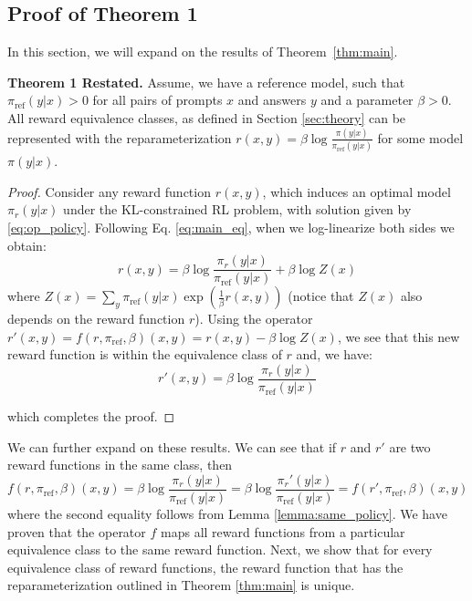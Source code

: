 \documentclass{article}
\newcommand{\piref}{\pi_\text{ref}}
\begin{document}
\subsection{Proof of Theorem 1}
\label{app:thm1}

In this section, we will expand on the results of Theorem~\ref{thm:main}. 

\begin{em}
{\bf Theorem 1 Restated.}
    Assume, we have a reference model, such that $\piref(y|x)>0$ for all pairs of prompts $x$ and answers $y$ and a parameter $\beta>0$. All reward equivalence classes, as defined in Section \ref{sec:theory} can be represented with the reparameterization $r(x, y) = \beta \log \frac{\pi(y|x)}{\piref(y|x)}$ for some model $\pi(y|x)$.
\end{em}
\begin{proof}
Consider any reward function $r(x,y)$, which induces an optimal model $\pi_r(y|x)$ under the KL-constrained RL problem, with solution given by \ref{eq:op_policy}. Following Eq. \ref{eq:main_eq}, when we log-linearize both sides we obtain:
\begin{equation*}
    r(x,y) =\beta \log \frac{\pi_r(y|x)}{\piref(y|x)} + \beta \log Z(x)
\end{equation*}
where $Z(x) =\sum_{y}\piref(y|x)\exp\left(\frac{1}{\beta}r(x, y)\right)$ (notice that $Z(x)$ also depends on the reward function $r$). Using the operator $r'(x, y) = f(r, \piref, \beta)(x, y) = r(x, y) - \beta \log Z(x)$, we see that this new reward function is within the equivalence class of $r$ and, we have:
\begin{equation*}
    r'(x,y) =\beta \log \frac{\pi_r(y|x)}{\piref(y|x)}
\end{equation*}

which completes the proof.
\end{proof}
We can further expand on these results. We can see that if $r$ and $r'$ are two reward functions in the same class, then
\begin{equation*}
    f(r, \piref, \beta)(x, y)= \beta \log \frac{\pi_r(y|x)}{\piref(y|x)}=
\beta \log \frac{\pi_r'(y|x)}{\piref(y|x)} = f(r', \piref, \beta)(x, y)
\end{equation*}
where the second equality follows from Lemma \ref{lemma:same_policy}. We have proven that the operator $f$ maps all reward functions from a particular equivalence class to the same reward function. Next, we show that for every equivalence class of reward functions, the reward function that has the reparameterization outlined in Theorem \ref{thm:main} is unique.
\end{document}
